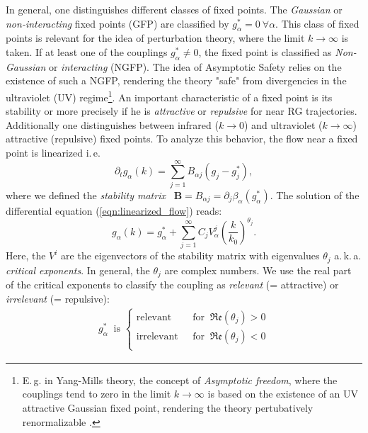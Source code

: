 In general, one distinguishes different classes of fixed points. The \textit{Gaussian} or \textit{non-interacting} fixed points  (GFP) are classified by $g^{*}_{\alpha}=0 \ \forall\alpha$. This class of fixed points is relevant for the idea of perturbation theory, where the limit $k\rightarrow\infty$ is taken. If at least one of the couplings $g^{*}_{\alpha}\neq 0$, the fixed point is classified as \textit{Non-Gaussian} or \textit{interacting} (NGFP). The idea of Asymptotic Safety relies on the existence of such a NGFP, rendering the theory "safe" from divergencies in the ultraviolet (UV) regime\footnote{E.\,g. in Yang-Mills theory, the concept of \textit{Asymptotic freedom}, where the couplings tend to zero in the limit $k\rightarrow\infty$ is based on the existence of an UV attractive Gaussian fixed point, rendering the theory pertubatively renormalizable \cite{GrossWilczek1973}.}. An important characteristic of a fixed point is its stability or more precisely if he is \textit{attractive} or \textit{repulsive} for near RG trajectories. Additionally one distinguishes between infrared ($k\rightarrow0$) and ultraviolet ($k\rightarrow\infty$) attractive (repulsive) fixed points. To analyze this behavior, the flow near a fixed point is linearized i.\,e.
\begin{equation}
	\partial_{t} g_{\alpha}(k)=\sum_{j=1}^{\infty} B_{\alpha j}\left(g_{j}-g_{j}^{*}\right),
	\label{eqn:linearized_flow}
\end{equation}
where we defined the \textit{stability matrix} \ $\mathbf{B} = B_{\alpha j} = \partial_j\beta_{\alpha}(g^{*}_{\alpha}) $. The solution of the differential equation (\ref{eqn:linearized_flow}) reads:
\begin{equation}
	g_{\alpha}(k)=g_{\alpha}^{*}+\sum_{j=1}^{\infty} C_{j} V_{\alpha}^{j}\left(\frac{k}{k_{0}}\right)^{\theta_{j}}.
\end{equation}
Here, the $V^{i}$ are the eigenvectors of the stability matrix with eigenvalues $\theta_j$ a.\,k.\,a. \textit{critical exponents}. In general, the $\theta_{j}$ are complex numbers. We use the real part of the critical exponents to classify the coupling as \textit{relevant} (= attractive) or \textit{irrelevant} (= repulsive):
\begin{align}
	g^{*}_{\alpha} \ \text{ is } \left\{\begin{array}{ll}{\text{relevant }} & {\text { for } \ \mathfrak{Re}\left(\theta_j\right) > 0} \\[10pt] {\text{irrelevant }} & {\text { for } \  \mathfrak{Re}\left(\theta_j\right) < 0} \\ \end{array}\right.
\end{align}
